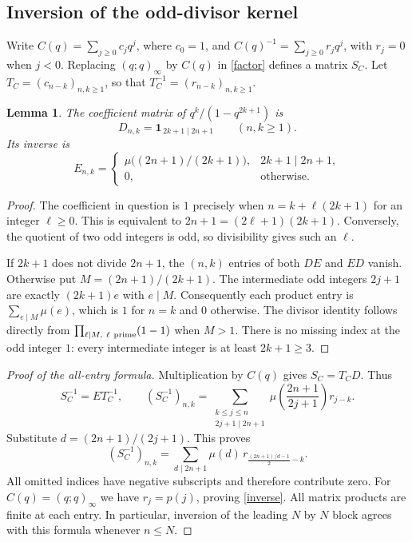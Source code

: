 \documentclass[11pt]{article}
\newtheorem{lemma}{Lemma}
\newcommand{\ind}{\mathbf{1}}
\begin{document}
\subsection*{Inversion of the odd-divisor kernel}
Write $C(q)=\sum_{j\geq0}c_jq^j$, where $c_0=1$, and
$C(q)^{-1}=\sum_{j\geq0}r_jq^j$, with $r_j=0$ when $j<0$.
Replacing $(q;q)_\infty$ by $C(q)$ in \eqref{factor} defines a matrix $S_C$.
Let $T_C=(c_{n-k})_{n,k\geq1}$, so that
$T_C^{-1}=(r_{n-k})_{n,k\geq1}$.

\begin{lemma}\label{odd}
The coefficient matrix of $q^k/(1-q^{2k+1})$ is
\[
 D_{n,k}=\ind_{\,2k+1\mid 2n+1}\qquad(n,k\geq1).
\]
Its inverse is
\[
 E_{n,k}=
 \begin{cases}
 \mu\bigl((2n+1)/(2k+1)\bigr),&2k+1\mid2n+1,\\
 0,&\text{otherwise}.
 \end{cases}
\]
\end{lemma}
\begin{proof}
The coefficient in question is $1$ precisely when
$n=k+\ell(2k+1)$ for an integer $\ell\geq0$.
This is equivalent to $2n+1=(2\ell+1)(2k+1)$.
Conversely, the quotient of two odd integers is odd, so divisibility gives
such an $\ell$.

If $2k+1$ does not divide $2n+1$, the $(n,k)$ entries of both $DE$ and
$ED$ vanish. Otherwise put $M=(2n+1)/(2k+1)$. The intermediate odd
integers $2j+1$ are exactly $(2k+1)e$ with $e\mid M$.
Consequently each product entry is $\sum_{e\mid M}\mu(e)$, which is
$1$ for $n=k$ and $0$ otherwise. The divisor identity follows directly
from $\prod_{\ell\mid M,\ \ell\ {\rm prime}}(1-1)$ when $M>1$.
There is no missing index at the odd integer $1$: every intermediate
integer is at least $2k+1\geq3$.
\end{proof}

\begin{proof}[Proof of the all-entry formula]
Multiplication by $C(q)$ gives $S_C=T_CD$. Thus
\[
 S_C^{-1}=ET_C^{-1},\qquad
 (S_C^{-1})_{n,k}
 =\sum_{\substack{k\leq j\leq n\\2j+1\mid2n+1}}
 \mu\left(\frac{2n+1}{2j+1}\right)r_{j-k}.
\]
Substitute $d=(2n+1)/(2j+1)$. This proves
\begin{equation}\label{general}
 (S_C^{-1})_{n,k}
 =\sum_{d\mid2n+1}\mu(d)\,
 r_{\frac{(2n+1)/d-1}{2}-k}.
\end{equation}
All omitted indices have negative subscripts and therefore contribute zero.
For $C(q)=(q;q)_\infty$ we have $r_j=p(j)$, proving \eqref{inverse}.
All matrix products are finite at each entry. In particular, inversion of
the leading $N$ by $N$ block agrees with this formula whenever $n\leq N$.
\end{proof}
\end{document}
